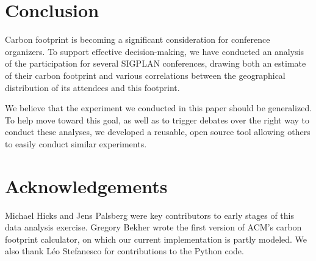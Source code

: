 \section{Conclusion}

Carbon footprint is becoming a significant consideration for conference
organizers. To support effective decision-making, we have conducted an
analysis of the participation for several SIGPLAN conferences, drawing both
an estimate of their carbon footprint and various correlations between the
geographical distribution of its attendees and this footprint.


We believe that the experiment we conducted in this paper should be
generalized.  To help move toward this goal, as well as to trigger debates
over the right way to conduct these analyses, we developed a reusable, open
source tool allowing others to easily conduct similar experiments.

\section*{Acknowledgements}

Michael Hicks and Jens Palsberg were key contributors to early stages of this
data analysis exercise.  Gregory Bekher wrote the first version of ACM's
carbon footprint calculator, on which our current implementation is partly
modeled.
We also thank Léo Stefanesco for contributions to the Python code.

